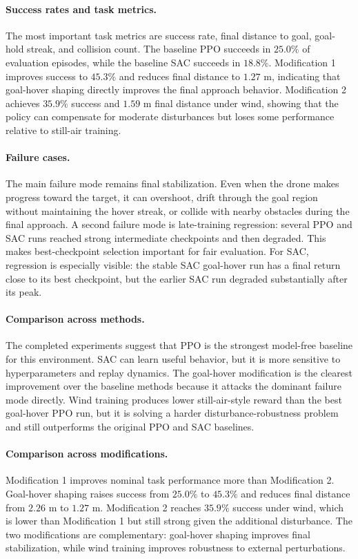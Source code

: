 \documentclass{article}
\begin{document}
\paragraph{Success rates and task metrics.}
The most important task metrics are success rate, final distance to goal, goal-hold streak, and collision count. The baseline PPO succeeds in $25.0\%$ of evaluation episodes, while the baseline SAC succeeds in $18.8\%$. Modification 1 improves success to $45.3\%$ and reduces final distance to $1.27$ m, indicating that goal-hover shaping directly improves the final approach behavior. Modification 2 achieves $35.9\%$ success and $1.59$ m final distance under wind, showing that the policy can compensate for moderate disturbances but loses some performance relative to still-air training.

\paragraph{Failure cases.}
The main failure mode remains final stabilization. Even when the drone makes progress toward the target, it can overshoot, drift through the goal region without maintaining the hover streak, or collide with nearby obstacles during the final approach. A second failure mode is late-training regression: several PPO and SAC runs reached strong intermediate checkpoints and then degraded. This makes best-checkpoint selection important for fair evaluation. For SAC, regression is especially visible: the stable SAC goal-hover run has a final return close to its best checkpoint, but the earlier SAC run degraded substantially after its peak.

\paragraph{Comparison across methods.}
The completed experiments suggest that PPO is the strongest model-free baseline for this environment. SAC can learn useful behavior, but it is more sensitive to hyperparameters and replay dynamics. The goal-hover modification is the clearest improvement over the baseline methods because it attacks the dominant failure mode directly. Wind training produces lower still-air-style reward than the best goal-hover PPO run, but it is solving a harder disturbance-robustness problem and still outperforms the original PPO and SAC baselines.

\paragraph{Comparison across modifications.}
Modification 1 improves nominal task performance more than Modification 2. Goal-hover shaping raises success from $25.0\%$ to $45.3\%$ and reduces final distance from $2.26$ m to $1.27$ m. Modification 2 reaches $35.9\%$ success under wind, which is lower than Modification 1 but still strong given the additional disturbance. The two modifications are complementary: goal-hover shaping improves final stabilization, while wind training improves robustness to external perturbations.
\end{document}
